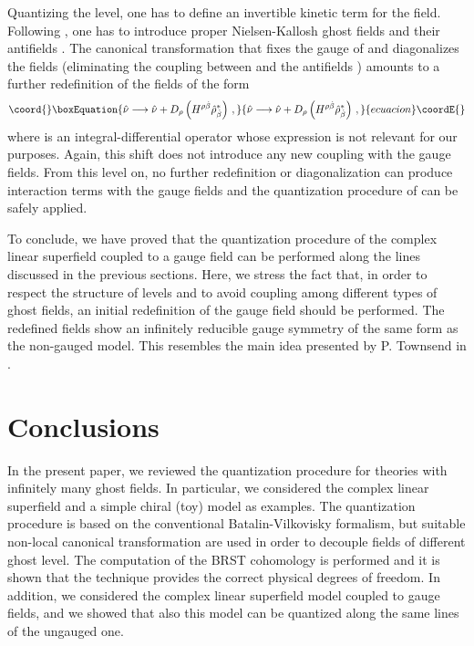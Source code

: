 \documentclass[a4paper,12pt]{article}
\begin{document}
Quantizing the \coordHE{} level, one has to define an invertible
kinetic term for the \myHighlight{$\hat \nu$}\coordHE{} field.
Following \cite{GPZ}, one has to introduce proper Nielsen-Kallosh
ghost fields \myHighlight{$\hat \rho_\alpha$}\coordHE{} and their antifields \myHighlight{$\hat
\rho^*_{\dot\alpha}$}\coordHE{}. The canonical transformation that fixes the
gauge of \myHighlight{$\nu$}\coordHE{} and diagonalizes the fields (eliminating the
coupling between \myHighlight{$\hat \nu$}\coordHE{} and the antifields \myHighlight{$\hat
\rho^*_{\dot\alpha}$}\coordHE{}) amounts to a further redefinition of the \myHighlight{$\hat
\nu$}\coordHE{} fields of the form
\begin{equation}\coord{}\boxEquation{
  \label{gau_7}
\hat\nu \longrightarrow \hat\nu  + D_\rho \left( H^{\rho \dot\beta} \hat
  \rho^*_{\dot\beta} \right)\,,  
}{
  \hat\nu \longrightarrow \hat\nu  + D_\rho \left( H^{\rho \dot\beta} \hat
  \rho^*_{\dot\beta} \right)\,,  
}{ecuacion}\coordE{}\end{equation}
where \coordHE{} is an integral-differential operator whose
expression is not relevant for our purposes. Again, this shift does
not introduce any new coupling with the gauge fields. From this level
on, no further redefinition or diagonalization can produce interaction
terms with the gauge fields and the quantization procedure of
\cite{GPZ} can be safely applied.

To conclude, we have proved that the quantization procedure of the complex
linear superfield coupled to a gauge field can be performed along the lines
discussed in the previous sections. Here, we stress the fact that, in
order to respect the structure of levels and to avoid coupling among
different types of ghost fields, an initial redefinition of the gauge
field should be performed. The redefined fields show an infinitely 
reducible gauge symmetry of the same form as the non-gauged model. This
resembles the main idea presented by P. Townsend in \cite{3lectures}.


\section{Conclusions}
\label{conclusion}

In the present paper, we reviewed the quantization procedure for
theories with infinitely many ghost fields. In particular, we
considered the complex linear superfield and a simple chiral (toy)
model as examples. The quantization procedure is based on the
conventional Batalin-Vilkovisky formalism, but suitable non-local
canonical transformation are used in order to decouple fields of
different ghost level. The computation of the BRST cohomology
is performed and it is shown that the technique provides the correct
physical degrees of freedom. 
In addition, we considered the complex linear superfield model 
coupled to gauge fields, and we showed that also this model 
can be quantized along the same lines of the ungauged one. 
\end{document}
